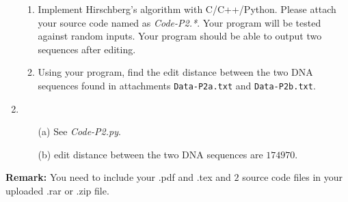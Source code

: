 \documentclass[12pt,a4paper]{article}
\makeatletter
\newtheorem*{solution}{Solution}
\theoremstyle{definition}
\renewenvironment{solution}[1][Solution] {\par\pushQED{\qed}\normalfont\topsep6\p@\@plus6\p@\relax\trivlist\item[\hskip\labelsep\bfseries#1\@addpunct{.}]\ignorespaces}{\popQED\endtrivlist\@endpefalse} \makeatother
\makeatother
\begin{document}
\begin{enumerate}
    \begin{enumerate}
        \item
        Implement Hirschberg's algorithm with C/C++/Python. Please attach your source code named as {\color{red}\emph{Code-P2.*}}. Your program will be tested against random inputs. Your program should be able to output two sequences after editing.

        \item
        Using your program, find the edit distance between the two DNA sequences found in attachments \texttt{Data-P2a.txt} and \texttt{Data-P2b.txt}.
    \end{enumerate}
    \begin{solution}
    	\noindent
        \begin{enumerate}
        	\item[(a)] See \emph{Code-P2.py}.
        	\item[(b)] edit distance between the two DNA sequences are $174970$.        \end{enumerate}                         
    \end{solution}

\end{enumerate}

\vspace{20pt}

\textbf{Remark:} You need to include your .pdf and .tex and {\color{red}\emph{$2$}} source code files in your uploaded .rar or .zip file.

\end{document}
